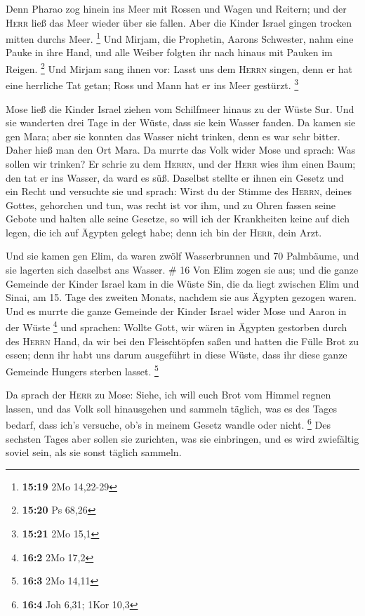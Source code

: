  Denn Pharao zog hinein ins Meer mit Rossen und Wagen und
Reitern; und der \textsc{Herr} ließ das Meer wieder über sie fallen.
Aber die Kinder Israel gingen trocken mitten durchs Meer. \footnote{\textbf{15:19}
  2Mo 14,22-29}  Und Mirjam, die Prophetin, Aarons
Schwester, nahm eine Pauke in ihre Hand, und alle Weiber folgten ihr
nach hinaus mit Pauken im Reigen. \footnote{\textbf{15:20} Ps 68,26}
 Und Mirjam sang ihnen vor: Lasst uns dem \textsc{Herrn}
singen, denn er hat eine herrliche Tat getan; Ross und Mann hat er ins
Meer gestürzt. \footnote{\textbf{15:21} 2Mo 15,1}

 Mose ließ die Kinder Israel ziehen vom Schilfmeer hinaus
zu der Wüste Sur. Und sie wanderten drei Tage in der Wüste, dass sie
kein Wasser fanden.  Da kamen sie gen Mara; aber sie
konnten das Wasser nicht trinken, denn es war sehr bitter. Daher hieß
man den Ort Mara.  Da murrte das Volk wider Mose und
sprach: Was sollen wir trinken?  Er schrie zu dem
\textsc{Herrn}, und der \textsc{Herr} wies ihm einen Baum; den tat er
ins Wasser, da ward es süß. Daselbst stellte er ihnen ein Gesetz und ein
Recht und versuchte sie  und sprach: Wirst du der Stimme
des \textsc{Herrn}, deines Gottes, gehorchen und tun, was recht ist vor
ihm, und zu Ohren fassen seine Gebote und halten alle seine Gesetze, so
will ich der Krankheiten keine auf dich legen, die ich auf Ägypten
gelegt habe; denn ich bin der \textsc{Herr}, dein Arzt.

 Und sie kamen gen Elim, da waren zwölf Wasserbrunnen und
70 Palmbäume, und sie lagerten sich daselbst ans Wasser. \# 16
 Von Elim zogen sie aus; und die ganze Gemeinde der Kinder
Israel kam in die Wüste Sin, die da liegt zwischen Elim und Sinai, am
15. Tage des zweiten Monats, nachdem sie aus Ägypten gezogen waren.
 Und es murrte die ganze Gemeinde der Kinder Israel wider
Mose und Aaron in der Wüste \footnote{\textbf{16:2} 2Mo 17,2}
 und sprachen: Wollte Gott, wir wären in Ägypten gestorben
durch des \textsc{Herrn} Hand, da wir bei den Fleischtöpfen saßen und
hatten die Fülle Brot zu essen; denn ihr habt uns darum ausgeführt in
diese Wüste, dass ihr diese ganze Gemeinde Hungers sterben lasset.
\footnote{\textbf{16:3} 2Mo 14,11}

 Da sprach der \textsc{Herr} zu Mose: Siehe, ich will euch
Brot vom Himmel regnen lassen, und das Volk soll hinausgehen und sammeln
täglich, was es des Tages bedarf, dass ich's versuche, ob's in meinem
Gesetz wandle oder nicht. \footnote{\textbf{16:4} Joh 6,31; 1Kor 10,3}
 Des sechsten Tages aber sollen sie zurichten, was sie
einbringen, und es wird zwiefältig soviel sein, als sie sonst täglich
sammeln.

